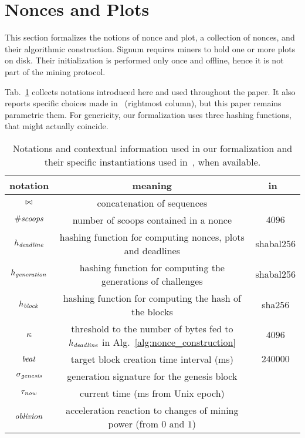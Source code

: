 \section{Nonces and Plots}\label{sec:nonces_and_plots}

This section formalizes the notions of nonce and plot, a collection of nonces, and their
algorithmic construction. Signum requires miners to hold one or more plots
on disk. Their initialization is performed only once and offline, hence it is
not part of the mining protocol.

Tab.~\ref{tab:notations} collects notations introduced here and used throughout the paper.
It also reports specific choices
made in~\cite{SignumPlotting} (rightmost column), but this paper remains parametric \wrt them.
For genericity, our formalization uses three hashing functions, that might actually coincide.

\begin{table}[t]
\begin{center}
\begin{tabular}{|c|c|c|}
  \hline
  \textbf{notation} & \textbf{meaning} & \textbf{in~\cite{SignumPlotting}}\\\hline\hline

  $\operatorname*{\bowtie}$ & concatenation of sequences & \\\hline
  ${\#\mathit{scoops}}$ & number of scoops contained in a nonce & $4096$\\\hline

  $h_{\mathit{deadline}}$ & hashing function for computing nonces, plots and deadlines & shabal256\\\hline

  $h_{\mathit{generation}}$ & hashing function for computing the generations of challenges & shabal256\\\hline

  $h_{\mathit{block}}$ & hashing function for computing the hash of the blocks & sha256 \\\hline

  $\kappa$ & threshold to the number of bytes fed to $h_{\mathit{deadline}}$ in Alg.~\ref{alg:nonce_construction} & $4096$\\\hline

  ${\mathit{beat}}$ & target block creation time interval (ms) & $240000$ \\\hline

  $\sigma_{\mathit{genesis}}$ & generation signature for the genesis block & \\\hline

  $\tau_{\mathit{now}}$ & current time (ms from Unix epoch) & \\\hline

  ${\mathit{oblivion}}$ & acceleration reaction to changes of mining power (from $0$ and $1$) & \\\hline
\end{tabular}
\end{center}
\caption{Notations and contextual information used in our formalization and their specific instantiations
  used in~\cite{SignumPlotting}, when available.}
\label{tab:notations}
\end{table}

